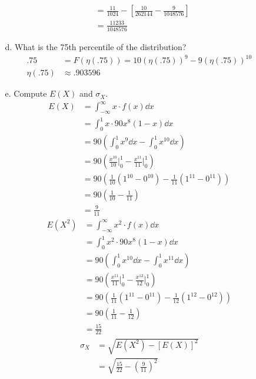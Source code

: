 \documentclass[letterpaper,12pt]{article}
\begin{document}
\begin{enumerate}
\begin{enumerate}
\begin{align*}
          &= \frac{11}{1024} - \left[\frac{10}{262144} - \frac{9}{1048576}\right] \\
          &= \frac{11233}{1048576}
        \end{align*}
      \item[d.]
        What is the 75th percentile of the distribution?
        \begin{align*}
          .75 &= F(\eta(.75)) = 10(\eta(.75))^9 - 9(\eta(.75))^{10} \\
          \eta(.75) &\approx .903596
        \end{align*}
      \item[e.]
        Compute $E(X)$ and $\sigma_X$.
        \begin{align*}
          E(X) &= \int_{-\infty}^{\infty} x \cdot f(x) \dd{x} \\
          &= \int_{0}^{1} x \cdot 90x^8(1 - x) \dd{x} \\
          &= 90 \left(\int_{0}^{1} x^9 \dd{x} - \int_{0}^{1} x^{10} \dd{x}\right) \\
          &= 90 \left(\frac{x^{10}}{10} \bigg\rvert_{0}^{1} - \frac{x^{11}}{11} \bigg\rvert_{0}^{1}\right) \\
          &= 90 \left(\frac{1}{10}(1^{10} - 0^{10}) - \frac{1}{11}(1^{11} - 0^{11})\right) \\
          &= 90 \left(\frac{1}{10} - \frac{1}{11}\right) \\
          &= \frac{9}{11}
        \end{align*}
        \begin{align*}
          E(X^2) &= \int_{-\infty}^{\infty} x^2 \cdot f(x) \dd{x} \\
          &= \int_{0}^{1} x^2 \cdot 90x^8(1 - x) \dd{x} \\
          &= 90 \left(\int_{0}^{1} x^{10} \dd{x} - \int_{0}^{1} x^{11} \dd{x}\right) \\
          &= 90 \left(\frac{x^{11}}{11} \bigg\rvert_{0}^{1} - \frac{x^{12}}{12} \bigg\rvert_{0}^{1}\right) \\
          &= 90 \left(\frac{1}{11}(1^{11} - 0^{11}) - \frac{1}{12}(1^{12} - 0^{12})\right) \\
          &= 90 \left(\frac{1}{11} - \frac{1}{12}\right) \\
          &= \frac{15}{22}
        \end{align*}
        \begin{align*}
          \sigma_X &= \sqrt{E(X^2) - [E(X)]^2} \\
          &= \sqrt{\frac{15}{22} - \left(\frac{9}{11}\right)^2} \\

\end{align*}
\end{enumerate}
\end{enumerate}
\end{document}
